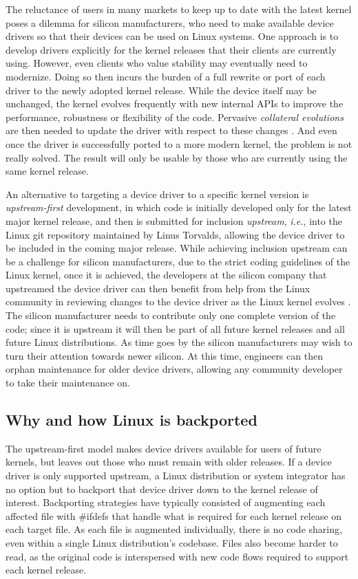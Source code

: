 The reluctance of users in many markets to keep up to date with the latest
kernel poses a dilemma for silicon manufacturers, who need to make
available device drivers so that their devices can be used on Linux
systems.  One approach is to develop drivers explicitly for the kernel
releases that their clients are currently using.  However, even clients who
value stability may eventually need to modernize.  Doing so then incurs the
burden of a full rewrite or port of each driver to the newly adopted kernel
release.  While the device itself may be unchanged, the kernel evolves
frequently with new internal APIs to improve the performance, robustness or
flexibility of the code.  Pervasive {\em collateral evolutions} are then
needed to update the driver with respect to these changes
\cite{Padioleau:eurosys06}.  And even once the driver is successfully
ported to a more modern kernel, the problem is not really solved.  The
result will only be usable by those who are currently using the same
kernel release.

An alternative to targeting a device driver to a specific kernel version is
\textit{upstream-first} development, in which code is initially developed
only for the latest major kernel release, and then is submitted for
inclusion {\em upstream}, {\em i.e.}, into the Linux git repository
maintained by Linus Torvalds, allowing the device driver to be included in
the coming major release.  While achieving inclusion upstream can be a
challenge for silicon manufacturers, due to the strict coding guidelines of
the Linux kernel, once it is achieved, the developers at the silicon
company that upstreamed the device driver can then benefit from help from
the Linux community in reviewing changes to the device driver as the Linux
kernel evolves \cite{KH:api}.  The silicon manufacturer needs to contribute
only one complete version of the code; since it is upstream it will then be
part of all future kernel releases and all future Linux distributions. As
time goes by the silicon manufacturers may wish to turn their attention
towards newer silicon.  At this time, engineers can then orphan maintenance
for older device drivers, allowing any community developer to take their
maintenance on.

\subsection{Why and how Linux is backported}

The upstream-first model makes device drivers available for users of future
kernels, but leaves out those who must remain with older releases.  If a
device driver is only supported upstream, a Linux distribution or system
integrator has no option but to backport that device driver down to the
kernel release of interest.  Backporting strategies have typically
consisted of augmenting each affected file with \#ifdefs that handle what
is required for each kernel release on each target file. As each file is
augmented individually, there is no code sharing, even within a single
Linux distribution's codebase. Files also become harder to read, as the
original code is interspersed with new code flows required to support each
kernel release.

